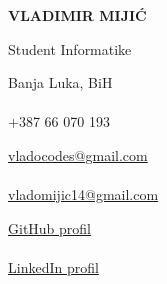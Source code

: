 \documentclass[9pt]{developercv} %
\begin{document}

\begin{minipage}[t]{0.45\textwidth}
	\vspace{-\baselineskip}
	{\Huge\textbf{\MakeUppercase{Vladimir Mijić}}}
	
	\vspace{6pt}
	
	{\huge Student Informatike}
\end{minipage}

\vspace{1cm}

\begin{minipage}[t]{0.3\textwidth}
    \vspace{-\baselineskip}
    
	{\faMapMarker \space}{Banja Luka, BiH}\\\\
	{\faPhone \space}{+387 66 070 193}\\
\end{minipage}
\hfill
\begin{minipage}[t]{0.3\textwidth}
	\vspace{-\baselineskip}
	
	{\faEnvelopeO \space}{\href{mailto:vladocodes@gmail.com}{vladocodes@gmail.com}}\\\\
	{\faEnvelopeO \space}{\href{mailto:vladomijic14@gmail.com}{vladomijic14@gmail.com}}\\
\end{minipage}
\hfill
\begin{minipage}[t]{0.3\textwidth}
	\vspace{-\baselineskip}
	
    {\faGithub \space}{\href{https://github.com/vladocodes}{GitHub profil}}\\\\
    {\faLinkedin \space}{\href{https://www.linkedin.com/in/vladimir-mijic}{LinkedIn profil}}\\
\end{minipage}

\vspace{.5cm}



\end{document}
